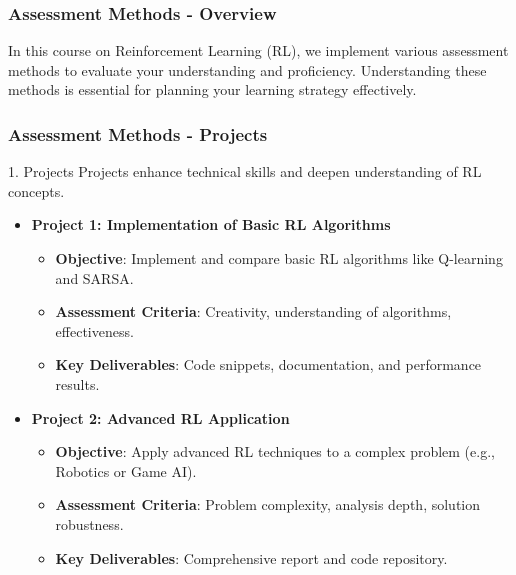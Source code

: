 \documentclass[aspectratio=169]{beamer}
\begin{document}
\begin{frame}[fragile]
    \frametitle{Assessment Methods - Overview}
    In this course on Reinforcement Learning (RL), we implement various assessment methods to evaluate your understanding and proficiency. Understanding these methods is essential for planning your learning strategy effectively.
\end{frame}

\begin{frame}[fragile]
    \frametitle{Assessment Methods - Projects}
    \begin{block}{1. Projects}
        Projects enhance technical skills and deepen understanding of RL concepts.
    \end{block}
    
    \begin{itemize}
        \item \textbf{Project 1: Implementation of Basic RL Algorithms}
        \begin{itemize}
            \item \textbf{Objective}: Implement and compare basic RL algorithms like Q-learning and SARSA.
            \item \textbf{Assessment Criteria}: Creativity, understanding of algorithms, effectiveness.
            \item \textbf{Key Deliverables}: Code snippets, documentation, and performance results.
        \end{itemize}

        \item \textbf{Project 2: Advanced RL Application}
        \begin{itemize}
            \item \textbf{Objective}: Apply advanced RL techniques to a complex problem (e.g., Robotics or Game AI).
            \item \textbf{Assessment Criteria}: Problem complexity, analysis depth, solution robustness.
            \item \textbf{Key Deliverables}: Comprehensive report and code repository.
        \end{itemize}
    \end{itemize}
\end{frame}
\end{document}
